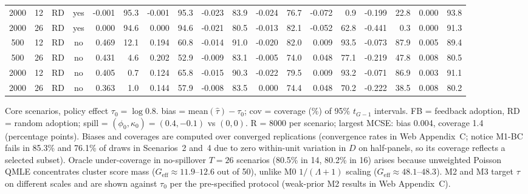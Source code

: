 \begin{table}[!t]
\begin{adjustbox}{max width=\linewidth}
\begin{tabular}{ccccrrrrrrrrrrrrrr}
2000 & 12 & RD & yes & -0.001 & 95.3 & -0.001 & 95.3 & -0.023 & 83.9 & -0.024 & 76.7 & -0.072 & 0.9 & -0.199 & 22.8 & 0.000 & 93.8 \\
2000 & 26 & RD & yes & 0.000 & 94.6 & 0.000 & 94.6 & -0.021 & 80.5 & -0.013 & 82.1 & -0.052 & 62.8 & -0.441 & 0.3 & 0.000 & 91.3 \\
500 & 12 & RD & no & 0.469 & 12.1 & 0.194 & 60.8 & -0.014 & 91.0 & -0.020 & 82.0 & 0.009 & 93.5 & -0.073 & 87.9 & 0.005 & 89.4 \\
500 & 26 & RD & no & 0.431 & 4.6 & 0.202 & 52.9 & -0.009 & 83.1 & -0.005 & 74.0 & 0.048 & 77.1 & -0.219 & 47.8 & 0.008 & 80.5 \\
2000 & 12 & RD & no & 0.405 & 0.7 & 0.124 & 65.8 & -0.015 & 90.3 & -0.022 & 79.5 & 0.009 & 93.2 & -0.071 & 86.9 & 0.003 & 91.1 \\
2000 & 26 & RD & no & 0.363 & 1.0 & 0.144 & 57.9 & -0.008 & 83.5 & 0.000 & 74.4 & 0.048 & 70.2 & -0.222 & 38.5 & 0.008 & 80.2 \\
\bottomrule
\end{tabular}
\end{adjustbox}
\par\smallskip\parbox{\linewidth}{\scriptsize Core scenarios, policy effect $\tau_0=\log 0.8$. bias = mean$(\hat\tau)-\tau_0$; cov = coverage (\%) of 95\% $t_{G-1}$ intervals. FB = feedback adoption, RD = random adoption; spill = $(\phi_0,\kappa_0)=(0.4,-0.1)$ vs $(0,0)$. R = 8000 per scenario; largest MCSE: bias 0.004, coverage 1.4 (percentage points). Biases and coverages are computed over converged replications (convergence rates in Web Appendix~C; notice M1-BC fails in 85.3\% and 76.1\% of draws in Scenarios~2 and~4 due to zero within-unit variation in $D$ on half-panels, so its coverage reflects a selected subset). Oracle under-coverage in no-spillover $T=26$ scenarios (80.5\% in 14, 80.2\% in 16) arises because unweighted Poisson QMLE concentrates cluster score mass ($G_{\mathrm{eff}}\approx 11.9$--$12.6$ out of 50), unlike M0 $1/(\Lambda+1)$ scaling ($G_{\mathrm{eff}}\approx 48.1$--$48.3$). M2 and M3 target $\tau$ on different scales and are shown against $\tau_0$ per the pre-specified protocol (weak-prior M2 results in Web Appendix~C).}
\end{table}
